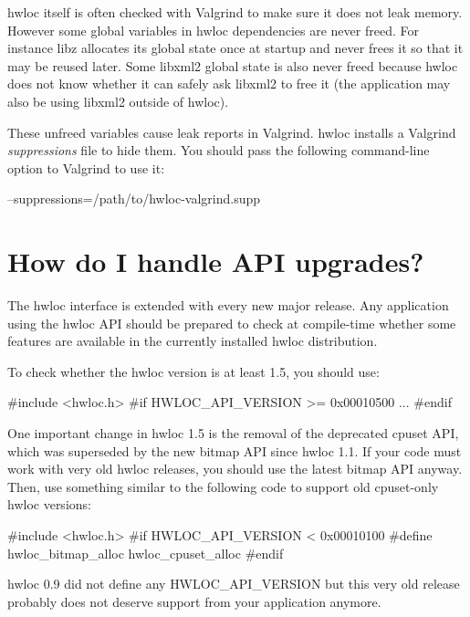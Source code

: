 hwloc itself is often checked with Valgrind to make sure it does not leak memory. However some global variables in hwloc dependencies are never freed. For instance libz allocates its global state once at startup and never frees it so that it may be reused later. Some libxml2 global state is also never freed because hwloc does not know whether it can safely ask libxml2 to free it (the application may also be using libxml2 outside of hwloc).

These unfreed variables cause leak reports in Valgrind. hwloc installs a Valgrind {\itshape suppressions\/} file to hide them. You should pass the following command-\/line option to Valgrind to use it: \begin{DoxyVerb}
  --suppressions=/path/to/hwloc-valgrind.supp
\end{DoxyVerb}
\hypertarget{a00011_faq_upgrade}{}\section{How do I handle API upgrades?}\label{a00011_faq_upgrade}
The hwloc interface is extended with every new major release. Any application using the hwloc API should be prepared to check at compile-\/time whether some features are available in the currently installed hwloc distribution.

To check whether the hwloc version is at least 1.5, you should use: \begin{DoxyVerb}
#include <hwloc.h>
#if HWLOC_API_VERSION >= 0x00010500
...
#endif
\end{DoxyVerb}


One important change in hwloc 1.5 is the removal of the deprecated cpuset API, which was superseded by the new bitmap API since hwloc 1.1. If your code must work with very old hwloc releases, you should use the latest bitmap API anyway. Then, use something similar to the following code to support old cpuset-\/only hwloc versions: \begin{DoxyVerb}
#include <hwloc.h>
#if HWLOC_API_VERSION < 0x00010100
#define hwloc_bitmap_alloc hwloc_cpuset_alloc
#endif
\end{DoxyVerb}


hwloc 0.9 did not define any {\ttfamily HWLOC\_\-API\_\-VERSION} but this very old release probably does not deserve support from your application anymore. 